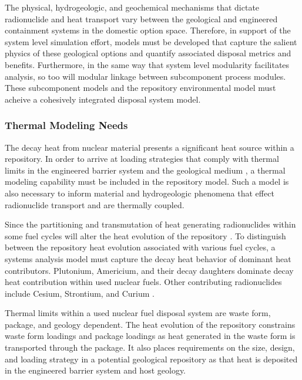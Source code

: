 
The physical, hydrogeologic, and geochemical mechanisms that dictate 
radionuclide and heat transport vary between the geological and engineered 
containment systems in the domestic option space.  Therefore, in support of the 
system level simulation effort, models must be developed that capture the 
salient physics of these geological options and quantify associated disposal 
metrics and benefits.  Furthermore, in the same way that system level modularity 
facilitates analysis, so too will modular linkage between subcomponent process 
modules. These subcomponent models and the repository environmental model must acheive a 
cohesively integrated disposal system model. 


\subsubsection{Thermal Modeling Needs}
The decay heat from nuclear material presents a significant heat source within a 
repository. In order to arrive at loading strategies that comply with thermal 
limits in the engineered barrier system and the geological medium , a thermal 
modeling capability must be included in the repository model. Such a model is 
also necessary to inform material and hydrogeologic phenomena that effect 
radionuclide transport and are thermally coupled. 

Since the partitioning and transmutation of heat generating radionuclides within  
some fuel cycles will alter the heat evolution of the repository 
\cite{swift_applying_2010}. To distinguish  between the repository heat 
evolution associated with various fuel cycles, a systems analysis model must 
capture the decay heat behavior of dominant heat contributors.  Plutonium, 
Americium, and their decay daughters dominate decay heat contribution within 
used nuclear fuels. Other contributing radionuclides include Cesium, Strontium, 
and Curium \cite{piet_which_2007}. 

Thermal limits within a used nuclear fuel disposal system are waste form, 
package, and geology dependent. The heat evolution of the repository 
constrains waste form loadings and package loadings as heat 
generated in the waste form is transported through the package. It 
also places requirements on the size, design, and loading strategy in a 
potential geological repository as that heat is deposited in the engineered 
barrier system and host geology.

